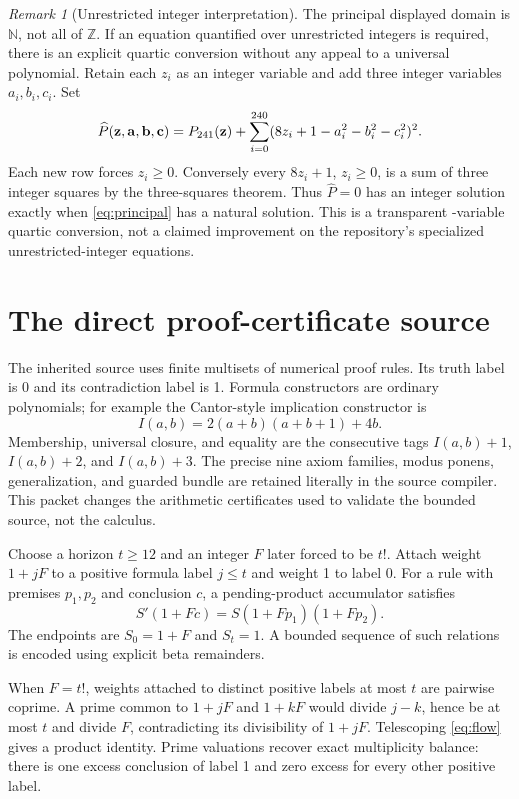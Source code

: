 \documentclass[11pt,letterpaper]{article}
\newcommand{\N}{\mathbb N}
\newcommand{\Z}{\mathbb Z}
\theoremstyle{remark}\newtheorem{remark}[theorem]{Remark}
\begin{document}
\begin{remark}[Unrestricted integer interpretation]
The principal displayed domain is $\N$, not all of $\Z$.  If an equation
quantified over unrestricted integers is required, there is an explicit
quartic conversion without any appeal to a universal polynomial.  Retain
each $z_i$ as an integer variable and add three integer variables
$a_i,b_i,c_i$.  Set
\[
 \widehat P(\mathbf z,\mathbf a,\mathbf b,\mathbf c)
 =P_{241}(\mathbf z)+
 \sum_{i=0}^{240}(8z_i+1-a_i^2-b_i^2-c_i^2)^2.
\]
Each new row forces $z_i\ge0$.  Conversely every $8z_i+1$, $z_i\ge0$,
is a sum of three integer squares by the three-squares theorem.  Thus
$\widehat P=0$ has an integer solution exactly when
\eqref{eq:principal} has a natural solution.  This is a transparent
\IntegerVars-variable quartic conversion, not a claimed improvement on the
repository's specialized unrestricted-integer equations.
\end{remark}

\section{The direct proof-certificate source}

The inherited source uses finite multisets of numerical proof rules.  Its
truth label is 0 and its contradiction label is 1.  Formula constructors
are ordinary polynomials; for example the Cantor-style implication
constructor is
\[
 I(a,b)=2(a+b)(a+b+1)+4b.
\]
Membership, universal closure, and equality are the consecutive tags
$I(a,b)+1$, $I(a,b)+2$, and $I(a,b)+3$.  The precise nine axiom families,
modus ponens, generalization, and guarded bundle are retained literally
in the source compiler.  This packet changes the arithmetic certificates
used to validate the bounded source, not the calculus.

Choose a horizon $t\ge12$ and an integer $F$ later forced to be $t!$.
Attach weight $1+jF$ to a positive formula label $j\le t$ and weight 1
to label 0.  For a rule with premises $p_1,p_2$ and conclusion $c$, a
pending-product accumulator satisfies
\begin{equation}\label{eq:flow}
 S'(1+Fc)=S(1+Fp_1)(1+Fp_2).
\end{equation}
The endpoints are $S_0=1+F$ and $S_t=1$.  A bounded sequence of such
relations is encoded using explicit beta remainders.

When $F=t!$, weights attached to distinct positive labels at most $t$
are pairwise coprime.  A prime common to $1+jF$ and $1+kF$ would divide
$j-k$, hence be at most $t$ and divide $F$, contradicting its divisibility
of $1+jF$.  Telescoping \eqref{eq:flow} gives a product identity.  Prime
valuations recover exact multiplicity balance: there is one excess
conclusion of label 1 and zero excess for every other positive label.
\end{document}
